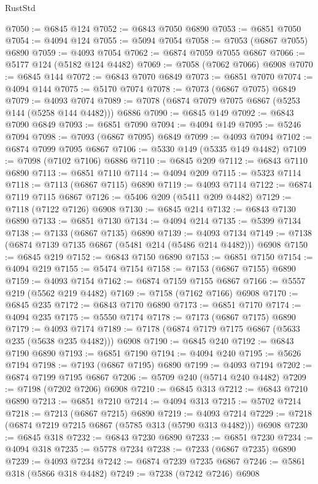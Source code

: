 \begin{lexlean}{RustStd}
\begin{coremodule}
@7050 := @6845 @124
@7052 := @6843 @7050 @6890
@7053 := @6851 @7050
@7054 := @4094 @124
@7055 := @5094 @7054
@7058 := @7053 (@6867 @7055) @6890
@7059 := @4093 @7054
@7062 := @6874 @7059 @7055 @6867
@7066 := @5177 @124 (@5182 @124 @4482)
@7069 := @7058 (@7062 @7066) @6908
@7070 := @6845 @144
@7072 := @6843 @7070 @6849
@7073 := @6851 @7070
@7074 := @4094 @144
@7075 := @5170 @7074
@7078 := @7073 (@6867 @7075) @6849
@7079 := @4093 @7074
@7089 := @7078 (@6874 @7079 @7075 @6867 (@5253 @144 (@5258 @144 @4482))) @6886
@7090 := @6845 @149
@7092 := @6843 @7090 @6849
@7093 := @6851 @7090
@7094 := @4094 @149
@7095 := @5246 @7094
@7098 := @7093 (@6867 @7095) @6849
@7099 := @4093 @7094
@7102 := @6874 @7099 @7095 @6867
@7106 := @5330 @149 (@5335 @149 @4482)
@7109 := @7098 (@7102 @7106) @6886
@7110 := @6845 @209
@7112 := @6843 @7110 @6890
@7113 := @6851 @7110
@7114 := @4094 @209
@7115 := @5323 @7114
@7118 := @7113 (@6867 @7115) @6890
@7119 := @4093 @7114
@7122 := @6874 @7119 @7115 @6867
@7126 := @5406 @209 (@5411 @209 @4482)
@7129 := @7118 (@7122 @7126) @6908
@7130 := @6845 @214
@7132 := @6843 @7130 @6890
@7133 := @6851 @7130
@7134 := @4094 @214
@7135 := @5399 @7134
@7138 := @7133 (@6867 @7135) @6890
@7139 := @4093 @7134
@7149 := @7138 (@6874 @7139 @7135 @6867 (@5481 @214 (@5486 @214 @4482))) @6908
@7150 := @6845 @219
@7152 := @6843 @7150 @6890
@7153 := @6851 @7150
@7154 := @4094 @219
@7155 := @5474 @7154
@7158 := @7153 (@6867 @7155) @6890
@7159 := @4093 @7154
@7162 := @6874 @7159 @7155 @6867
@7166 := @5557 @219 (@5562 @219 @4482)
@7169 := @7158 (@7162 @7166) @6908
@7170 := @6845 @235
@7172 := @6843 @7170 @6890
@7173 := @6851 @7170
@7174 := @4094 @235
@7175 := @5550 @7174
@7178 := @7173 (@6867 @7175) @6890
@7179 := @4093 @7174
@7189 := @7178 (@6874 @7179 @7175 @6867 (@5633 @235 (@5638 @235 @4482))) @6908
@7190 := @6845 @240
@7192 := @6843 @7190 @6890
@7193 := @6851 @7190
@7194 := @4094 @240
@7195 := @5626 @7194
@7198 := @7193 (@6867 @7195) @6890
@7199 := @4093 @7194
@7202 := @6874 @7199 @7195 @6867
@7206 := @5709 @240 (@5714 @240 @4482)
@7209 := @7198 (@7202 @7206) @6908
@7210 := @6845 @313
@7212 := @6843 @7210 @6890
@7213 := @6851 @7210
@7214 := @4094 @313
@7215 := @5702 @7214
@7218 := @7213 (@6867 @7215) @6890
@7219 := @4093 @7214
@7229 := @7218 (@6874 @7219 @7215 @6867 (@5785 @313 (@5790 @313 @4482))) @6908
@7230 := @6845 @318
@7232 := @6843 @7230 @6890
@7233 := @6851 @7230
@7234 := @4094 @318
@7235 := @5778 @7234
@7238 := @7233 (@6867 @7235) @6890
@7239 := @4093 @7234
@7242 := @6874 @7239 @7235 @6867
@7246 := @5861 @318 (@5866 @318 @4482)
@7249 := @7238 (@7242 @7246) @6908

\end{coremodule}
\end{lexlean}

